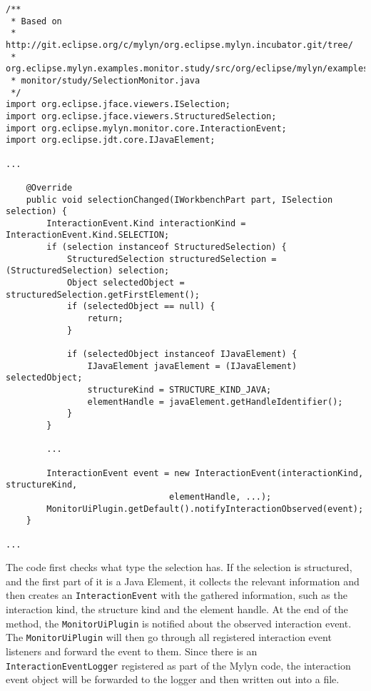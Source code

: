 
\begin{lstlisting}
/** 
 * Based on
 * http://git.eclipse.org/c/mylyn/org.eclipse.mylyn.incubator.git/tree/
 * org.eclipse.mylyn.examples.monitor.study/src/org/eclipse/mylyn/examples/
 * monitor/study/SelectionMonitor.java
 */
import org.eclipse.jface.viewers.ISelection;
import org.eclipse.jface.viewers.StructuredSelection;
import org.eclipse.mylyn.monitor.core.InteractionEvent;
import org.eclipse.jdt.core.IJavaElement;

...

    @Override
    public void selectionChanged(IWorkbenchPart part, ISelection selection) {
		InteractionEvent.Kind interactionKind = InteractionEvent.Kind.SELECTION;
		if (selection instanceof StructuredSelection) {
			StructuredSelection structuredSelection = (StructuredSelection) selection;
			Object selectedObject = structuredSelection.getFirstElement();
			if (selectedObject == null) {
				return;
			}

			if (selectedObject instanceof IJavaElement) {
				IJavaElement javaElement = (IJavaElement) selectedObject;
				structureKind = STRUCTURE_KIND_JAVA;
				elementHandle = javaElement.getHandleIdentifier();
			}
		}

		...

		InteractionEvent event = new InteractionEvent(interactionKind, structureKind,
                                elementHandle, ...);
		MonitorUiPlugin.getDefault().notifyInteractionObserved(event);
	}

...
\end{lstlisting}

The code first checks what type the selection has. If the selection is structured, and the first part of it is a Java Element, it collects the relevant information and then creates an \texttt{InteractionEvent} with the gathered information, such as the interaction kind, the structure kind and the element handle. At the end of the method, the \texttt{MonitorUiPlugin} is notified about the observed interaction event. The \texttt{MonitorUiPlugin} will then go through all registered interaction event listeners and forward the event to them. Since there is an \texttt{InteractionEventLogger} registered as part of the Mylyn code, the interaction event object will be forwarded to the logger and then written out into a file. 

